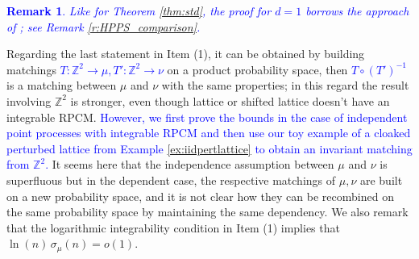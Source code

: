 \documentclass[12pt]{article}
\newtheorem{remark}{Remark}
\newcommand{\Z}{\mathbb{Z}}
\newcommand{\1}{\mathbf{1}}
\newcommand{\md}{\mathrm{d}}
\newcommand{\blue}[1]{\textcolor{blue}{#1}}
\newcommand{\RL}[1]{\textcolor{blue}{#1}}
\newcommand{\dy}[1]{\textcolor{blue}{#1}}
\newcommand{\RL}[1]{#1}%
\newcommand{\dy}[1]{#1}%
\renewcommand{\footnote}[1]{}
\begin{document}
{{{%
%
%



%
\RL{
\begin{remark}  Like for Theorem \ref{thm:std}, the proof for $ d = 1$ borrows the approach of \cite{holroyd2009poisson}; see Remark  \ref{r:HPPS_comparison}.
\end{remark}}
Regarding the last statement in Item (1),    it can be obtained by building matchings \dy{$ T:\mathbb{Z}^{2} \to \mu,T':\mathbb{Z}^{2} \to \nu$} on a product probability space, then \dy{$T \circ (T')^{-1}$} is a matching between $\mu$ and $\nu$ with the same properties; in this regard the result
involving $ \mathbb{Z} ^{2}$ is stronger, {even though lattice or shifted lattice doesn't have an integrable RPCM. \dy{However, we first prove the bounds in the case of independent point processes with integrable RPCM and then use our toy example of \RL{a cloaked }perturbed lattice from Example \ref{ex:iidpertlattice} to obtain an invariant matching from $\Z^2$.} It seems here that the independence assumption between $\mu$ and $\nu$ is superfluous but  in the dependent case, the respective matchings of $ \mu ,\nu $ are built on a new
probability space, and it is not clear how they can be recombined on the same probability space by maintaining the same dependency. We also remark that the logarithmic
integrability condition in Item (1) implies that $\ln(n) \, \sigma_\mu(n) = o(1)$.}

}}}
\end{document}
